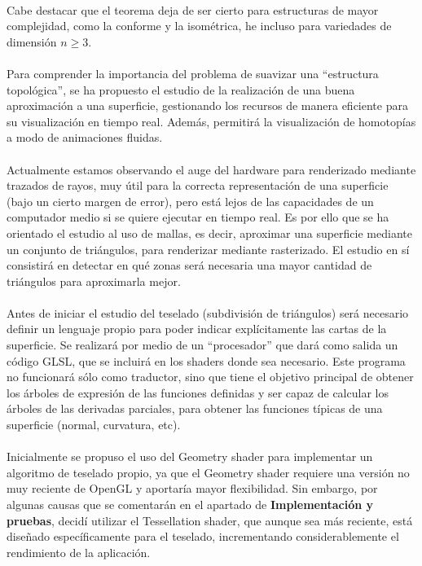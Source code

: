 \\Cabe destacar que el teorema deja de ser cierto para estructuras de mayor complejidad, como la conforme y la isométrica, he incluso para variedades de dimensión $n \geq 3$.\\
\\Para comprender la importancia del problema de suavizar una ``estructura topológica'', se ha propuesto el estudio de la realización de una buena aproximación a una superficie, gestionando los recursos de manera eficiente para su visualización en tiempo real. Además, permitirá la visualización de homotopías a modo de animaciones fluidas.\\
\\Actualmente estamos observando el auge del hardware para renderizado mediante trazados de rayos, muy útil para la correcta representación de una superficie (bajo un cierto margen de error), pero está lejos de las capacidades de un computador medio si se quiere ejecutar en tiempo real. Es por ello que se ha orientado el estudio al uso de mallas, es decir, aproximar una superficie mediante un conjunto de triángulos, para renderizar mediante rasterizado. El estudio en sí consistirá en detectar en qué zonas será necesaria una mayor cantidad de triángulos para aproximarla mejor.\\
\\Antes de iniciar el estudio del teselado (subdivisión de triángulos) será necesario definir un lenguaje propio para poder indicar explícitamente las cartas de la superficie. Se realizará por medio de un ``procesador'' que dará como salida un código GLSL, que se incluirá en los shaders donde sea necesario. Este programa no funcionará sólo como traductor, sino que tiene el objetivo principal de obtener los árboles de expresión de las funciones definidas y ser capaz de calcular los árboles de las derivadas parciales, para obtener las funciones típicas de una superficie (normal, curvatura, etc).\\
\\Inicialmente se propuso el uso del Geometry shader para implementar un algoritmo de teselado propio, ya que el Geometry shader requiere una versión no muy reciente de OpenGL y aportaría mayor flexibilidad. Sin embargo, por algunas causas que se comentarán en el apartado de \textbf{Implementación y pruebas}, decidí utilizar el Tessellation shader, que aunque sea más reciente, está diseñado específicamente para el teselado, incrementando considerablemente el rendimiento de la aplicación.\\
